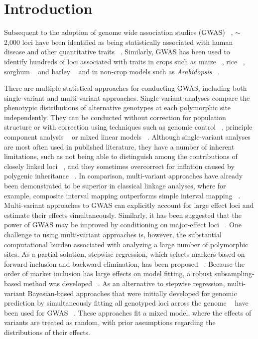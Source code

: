 \documentclass[10pt,letterpaper]{article}
\begin{document}
\linenumbers


\section*{Introduction}

Subsequent to the adoption of genome wide association studies (GWAS) ~\cite{Klein2005}, $\sim$2,000 loci have been identified as being statistically associated with human disease and other quantitative traits ~\cite{Visscher2012}. Similarly, GWAS has been used to identify hundreds of loci associated with traits in crops such as maize ~\cite{Brown2011, Tian2011}, rice ~\cite{Huang2010}, sorghum ~\cite{Morris2013} and barley ~\cite{Cockram2010} and in non-crop models such as \emph{Arabidopsis} ~\cite{Atwell2010, Meijon2014}. 

There are multiple statistical approaches for conducting GWAS, including both single-variant and multi-variant approaches. Single-variant analyses compare the phenotypic distributions of alternative genotypes at each polymorphic site independently. They can be conducted without correction for population structure or with correction using techniques such as genomic control ~\cite{Devlin1999}, principle component analysis ~\cite{Price2006} or mixed linear models ~\cite{Yu2006}. Although single-variant analyses are most often used in published literature, they have a number of inherent limitations, such as not being able to distinguish among the contributions of closely linked loci ~\cite{Yang2012}, and they sometimes overcorrect for inflation caused by polygenic inheritance ~\cite{Yang2011}. In comparison, multi-variant approaches have already been demonstrated to be superior in classical linkage analyses, where for example, composite interval mapping outperforms simple interval mapping ~\cite{Zeng1993}. Multi-variant approaches to GWAS can explicitly account for large effect loci and estimate their effects simultaneously. Similarly, it has been suggested that the power of GWAS may be improved by conditioning on major-effect loci ~\cite{Kang2010}. One challenge to using multi-variant approaches is, however, the substantial computational burden associated with analyzing a large number of polymorphic sites. As a partial solution, stepwise regression, which selects markers based on forward inclusion and backward elimination, has been proposed ~\cite{Segura2012}. Because the order of marker inclusion has large effects on model fitting, a robust subsampling-based method was developed ~\cite{Valdar2006}. As an alternative to stepwise regression, multi-variant Bayesian-based approaches that were initially developed for genomic prediction by simultaneously fitting all genotyped loci across the genome ~\cite{Meuwissen2001} have been used for GWAS ~\cite{Fan2011, Habier2011}. These approaches fit a mixed model, where the effects of variants are treated as random, with prior assumptions regarding the distributions of their effects. 
\end{document}
